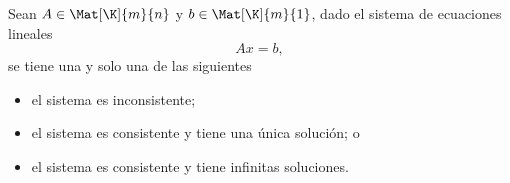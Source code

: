 \documentclass[compacto,10pt]{pubciencias-notas}
\begin{document}

\begin{teo}
    Sean $A\in \Mat[\K]{m}{n}$ y $b\in \Mat[\K]{m}{1}$, dado el sistema de ecuaciones lineales
    \[
        Ax=b,
    \]
    se tiene una y solo una de las siguientes
    \begin{itemize}
    \item
        el sistema es inconsistente;
    \item
        el sistema es consistente y tiene una única solución; o
    \item
        el sistema es consistente y tiene infinitas soluciones.
    \end{itemize}
\end{teo}
\end{document}
